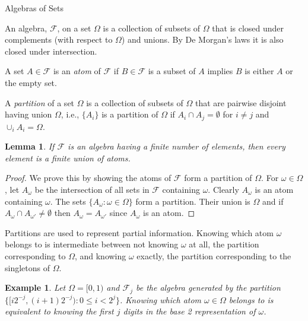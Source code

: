 \documentclass[fleqn]{amsart}
\newcommand{\F}{\mathcal{F}}
\newtheorem{lemma}[theorem]{Lemma}
\newtheorem{example}{Example}
\begin{document}
\begin{section}{Algebras of Sets}

An algebra, $\F$, on a set $\Omega$ is a collection of subsets of $\Omega$
that is closed under complements (with respect to $\Omega$) and unions. By
De Morgan's laws it is also closed under intersection.

A set $A\in\F$ is an {\em atom} of $\F$ if $B\in\F$ is a subset of $A$
implies $B$ is either $A$ or the empty set.

A {\em partition} of a set $\Omega$ is a collection of subsets of
$\Omega$ that are pairwise disjoint having union $\Omega$, i.e.,
$\{A_i\}$ is a partition of $\Omega$ if
$A_i \cap A_j = \emptyset$ for $i\not=j$ and
$\cup_i A_i = \Omega$.

\begin{lemma}
If $\F$ is an algebra having a finite number of elements, then every
element is a finite union of atoms.

\end{lemma}

\begin{proof}
We prove this by showing the atoms of $\F$ form a partition of $\Omega$.
For $\omega\in\Omega$, let $A_\omega$ be the intersection of all
sets in $\F$ containing $\omega$. Clearly $A_\omega$ is an atom
containing $\omega$. The sets $\{A_\omega\colon\omega\in\Omega\}$
form a partition. Their union is $\Omega$ and if $A_\omega\cap
A_{\omega'}\not=\emptyset$ then $A_{\omega} = A_{\omega'}$ since $A_\omega$
is an atom.

\end{proof}

Partitions are used to represent partial
information. Knowing which atom $\omega$ belongs to is intermediate
between not knowing $\omega$ at all, the partition corresponding
to $\Omega$, and knowing $\omega$ exactly, the partition
corresponding to the singletons of $\Omega$.

\begin{example}
Let $\Omega = [0, 1)$ and $\F_j$ be the algebra generated by
the partition $\{[i2^{-j}, (i + 1)2^{-j})\colon 0\le i < 2^j\}$.
Knowing which atom $\omega\in\Omega$ belongs to is equivalent
to knowing the first $j$ digits in the base 2 representation of $\omega$.
\end{example}

\end{section}
\end{document}
